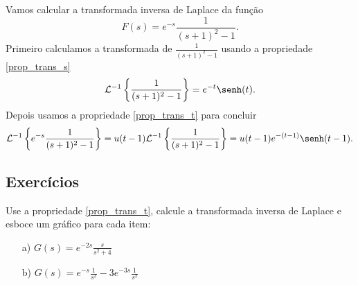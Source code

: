 \begin{ex} Vamos calcular a transformada inversa de Laplace da função
\begin{equation}
F(s)=e^{-s}\frac{1}{(s+1)^2-1}.
\end{equation}
Primeiro calculamos a transformada de $\frac{1}{(s+1)^2-1}$ usando a propriedade \ref{prop_trans_s}
\begin{equation}
\mathcal{L}^{-1}\left\{\frac{1}{(s+1)^2-1}\right\}=e^{-t}\senh(t).
\end{equation}
Depois usamos a propriedade \ref{prop_trans_t} para concluir
\begin{equation}
\mathcal{L}^{-1}\left\{e^{-s}\frac{1}{(s+1)^2-1}\right\}=u(t-1)\mathcal{L}^{-1}\left\{\frac{1}{(s+1)^2-1}\right\}=u(t-1)e^{-(t-1)}\senh(t-1).
\end{equation}
\end{ex}

\subsection*{Exercícios}
\begin{exer}Use a propriedade \ref{prop_trans_t}, calcule a transformada inversa de Laplace e esboce um gráfico para cada item:
\begin{itemize}
\item[a)] $G(s)=e^{-2s}\frac{s}{s^2+4}$
\item[b)] $G(s)=e^{-s}\frac{1}{s^2}-3e^{-3s}\frac{1}{s^2}$
\end{itemize}
\end{exer}


